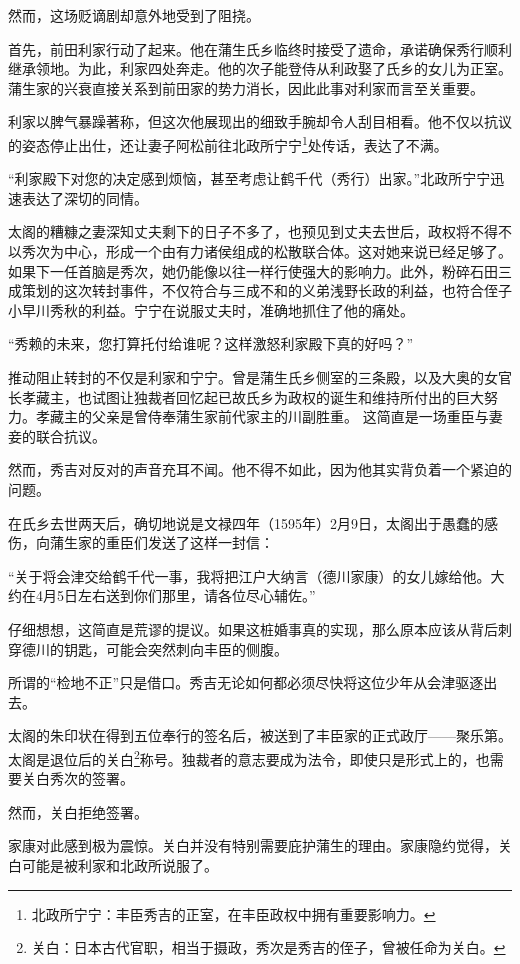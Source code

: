 \documentclass[
]{book}
\begin{document}
然而，这场贬谪剧却意外地受到了阻挠。

首先，前田利家行动了起来。他在蒲生氏乡临终时接受了遗命，承诺确保秀行顺利继承领地。为此，利家四处奔走。他的次子能登侍从利政娶了氏乡的女儿为正室。蒲生家的兴衰直接关系到前田家的势力消长，因此此事对利家而言至关重要。

利家以脾气暴躁著称，但这次他展现出的细致手腕却令人刮目相看。他不仅以抗议的姿态停止出仕，还让妻子阿松前往北政所宁宁\footnote{北政所宁宁：丰臣秀吉的正室，在丰臣政权中拥有重要影响力。}处传话，表达了不满。

``利家殿下对您的决定感到烦恼，甚至考虑让鹤千代（秀行）出家。''北政所宁宁迅速表达了深切的同情。

太阁的糟糠之妻深知丈夫剩下的日子不多了，也预见到丈夫去世后，政权将不得不以秀次为中心，形成一个由有力诸侯组成的松散联合体。这对她来说已经足够了。如果下一任首脑是秀次，她仍能像以往一样行使强大的影响力。此外，粉碎石田三成策划的这次转封事件，不仅符合与三成不和的义弟浅野长政的利益，也符合侄子小早川秀秋的利益。宁宁在说服丈夫时，准确地抓住了他的痛处。

``秀赖的未来，您打算托付给谁呢？这样激怒利家殿下真的好吗？''

推动阻止转封的不仅是利家和宁宁。曾是蒲生氏乡侧室的三条殿，以及大奥的女官长孝藏主，也试图让独裁者回忆起已故氏乡为政权的诞生和维持所付出的巨大努力。孝藏主的父亲是曾侍奉蒲生家前代家主的川副胜重。
这简直是一场重臣与妻妾的联合抗议。

然而，秀吉对反对的声音充耳不闻。他不得不如此，因为他其实背负着一个紧迫的问题。

在氏乡去世两天后，确切地说是文禄四年（1595年）2月9日，太阁出于愚蠢的感伤，向蒲生家的重臣们发送了这样一封信：

``关于将会津交给鹤千代一事，我将把江户大纳言（德川家康）的女儿嫁给他。大约在4月5日左右送到你们那里，请各位尽心辅佐。''

仔细想想，这简直是荒谬的提议。如果这桩婚事真的实现，那么原本应该从背后刺穿德川的钥匙，可能会突然刺向丰臣的侧腹。

所谓的``检地不正''只是借口。秀吉无论如何都必须尽快将这位少年从会津驱逐出去。

太阁的朱印状在得到五位奉行的签名后，被送到了丰臣家的正式政厅------聚乐第。太阁是退位后的关白\footnote{关白：日本古代官职，相当于摄政，秀次是秀吉的侄子，曾被任命为关白。}称号。独裁者的意志要成为法令，即使只是形式上的，也需要关白秀次的签署。

然而，关白拒绝签署。

家康对此感到极为震惊。关白并没有特别需要庇护蒲生的理由。家康隐约觉得，关白可能是被利家和北政所说服了。
\end{document}
